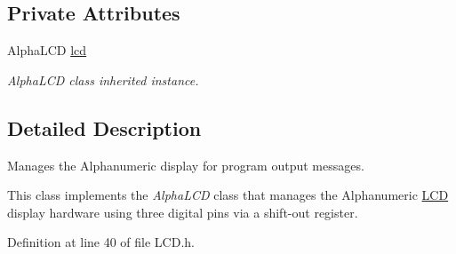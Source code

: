 \subsection*{Private Attributes}
\begin{DoxyCompactItemize}
\item 
Alpha\-L\-C\-D \hyperlink{class_l_c_d_ae4b9e9c4a04d3d976ffb09d112831a5a}{lcd}
\begin{DoxyCompactList}\small\item\em Alpha\-L\-C\-D class inherited instance. \end{DoxyCompactList}\end{DoxyCompactItemize}


\subsection{Detailed Description}
Manages the Alphanumeric display for program output messages. 

This class implements the {\itshape Alpha\-L\-C\-D} class that manages the Alphanumeric \hyperlink{class_l_c_d}{L\-C\-D} display hardware using three digital pins via a shift-\/out register. 

Definition at line 40 of file L\-C\-D.\-h.



